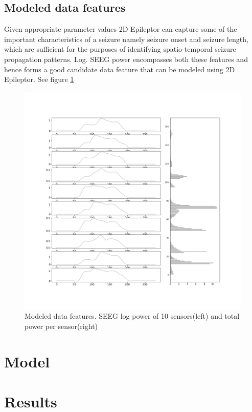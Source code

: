 \documentclass[12pt]{article}
\begin{document}
\subsection*{Modeled data features}
Given appropriate parameter values 2D Epileptor can capture some of the important characteristics of a seizure namely seizure onset and seizure length, which are sufficient for the purposes of identifying spatio-temporal seizure propagation patterns. Log. SEEG power encompasses both these features and hence forms a good candidate data feature that can be modeled using 2D Epileptor. See figure \ref{fig:data-features}
\begin{figure}[h!]
  \centering
  \includegraphics[width=\textwidth]{figures/modelled_data_features.png}
  \caption{Modeled data features. SEEG log power of 10 sensors(left) and total power per sensor(right)}
  \label{fig:data-features}
\end{figure}
\section*{Model}

\section*{Results}
\end{document}
